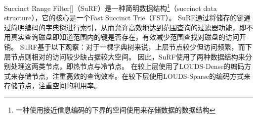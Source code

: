 
Succinct Range Filter[]（SuRF）是一种简明数据结构\footnote{一种使用接近信息编码的下界的空间使用来存储数据的数据结构}（succinct data structure），它的核心是一个Fast Succinct Trie（FST）。
SuRF通过将储存的键通过简明编码的字典树进行索引，从而允许高效地达到范围查询的过滤器功能，即不用真实查询磁盘即知道范围内的键是否存在，有效减少范围查找对磁盘的访问开销。
SuRF基于以下观察：对于一棵字典树来说，上层节点较少但访问频繁，而下层节点则相对的访问较少缺占据较大空间。
因此，SuRF使用了两种数据结构来分别处理这两类节点，即热节点与冷节点。
在较上层使用了LOUDS-Dense的编码方式来存储节点，注重高效的查询效率。在较下层使用LOUDS-Sparse的编码方式来存储节点，注重空间的利用率。


